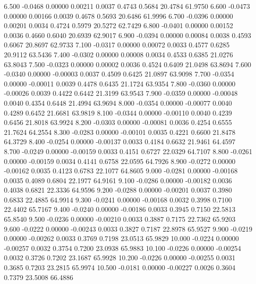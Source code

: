    6.500  -0.0468   0.00000   0.00211   0.0037   0.4743   0.5684  20.4784  61.9750
   6.600  -0.0473   0.00000   0.00166   0.0039   0.4678   0.5693  20.6486  61.9996
   6.700  -0.0396   0.00000   0.00201   0.0034   0.4724   0.5979  20.5272  62.7429
   6.800  -0.0401   0.00000   0.00152   0.0036   0.4660   0.6040  20.6939  62.9017
   6.900  -0.0394   0.00000   0.00084   0.0038   0.4593   0.6067  20.8697  62.9733
   7.100  -0.0317   0.00000   0.00072   0.0033   0.4577   0.6285  20.9112  63.5436
   7.400  -0.0302   0.00000   0.00008   0.0034   0.4533   0.6385  21.0276  63.8043
   7.500  -0.0323   0.00000   0.00002   0.0036   0.4524   0.6409  21.0498  63.8694
   7.600  -0.0340   0.00000  -0.00003   0.0037   0.4509   0.6425  21.0897  63.9098
   7.700  -0.0354   0.00000  -0.00011   0.0039   0.4478   0.6435  21.1724  63.9354
   7.800  -0.0360   0.00000  -0.00026   0.0039   0.4422   0.6442  21.3199  63.9543
   7.900  -0.0359   0.00000  -0.00048   0.0040   0.4354   0.6448  21.4994  63.9694
   8.000  -0.0354   0.00000  -0.00077   0.0040   0.4289   0.6452  21.6681  63.9819
   8.100  -0.0344   0.00000  -0.00110   0.0040   0.4239   0.6456  21.8018  63.9924
   8.200  -0.0303   0.00000  -0.00081   0.0036   0.4254   0.6555  21.7624  64.2554
   8.300  -0.0283   0.00000  -0.00101   0.0035   0.4221   0.6600  21.8478  64.3729
   8.400  -0.0254   0.00000  -0.00137   0.0033   0.4184   0.6632  21.9461  64.4597
   8.700  -0.0249   0.00000  -0.00159   0.0033   0.4151   0.6727  22.0329  64.7107
   8.800  -0.0261   0.00000  -0.00159   0.0034   0.4141   0.6758  22.0595  64.7926
   8.900  -0.0272   0.00000  -0.00162   0.0035   0.4123   0.6783  22.1077  64.8605
   9.000  -0.0281   0.00000  -0.00168   0.0035   0.4089   0.6804  22.1977  64.9161
   9.100  -0.0286   0.00000  -0.00182   0.0036   0.4038   0.6821  22.3336  64.9596
   9.200  -0.0288   0.00000  -0.00201   0.0037   0.3980   0.6833  22.4885  64.9914
   9.300  -0.0241   0.00000  -0.00168   0.0032   0.3998   0.7100  22.4402  65.7167
   9.400  -0.0240   0.00000  -0.00186   0.0033   0.3945   0.7150  22.5813  65.8540
   9.500  -0.0236   0.00000  -0.00210   0.0033   0.3887   0.7175  22.7362  65.9203
   9.600  -0.0222   0.00000  -0.00243   0.0033   0.3827   0.7187  22.8978  65.9527
   9.900  -0.0219   0.00000  -0.00262   0.0033   0.3769   0.7198  23.0513  65.9829
  10.000  -0.0224   0.00000  -0.00257   0.0032   0.3754   0.7200  23.0938  65.9883
  10.100  -0.0226   0.00000  -0.00254   0.0032   0.3726   0.7202  23.1687  65.9928
  10.200  -0.0226   0.00000  -0.00255   0.0031   0.3685   0.7203  23.2815  65.9974
  10.500  -0.0181   0.00000  -0.00227   0.0026   0.3604   0.7379  23.5008  66.4886
